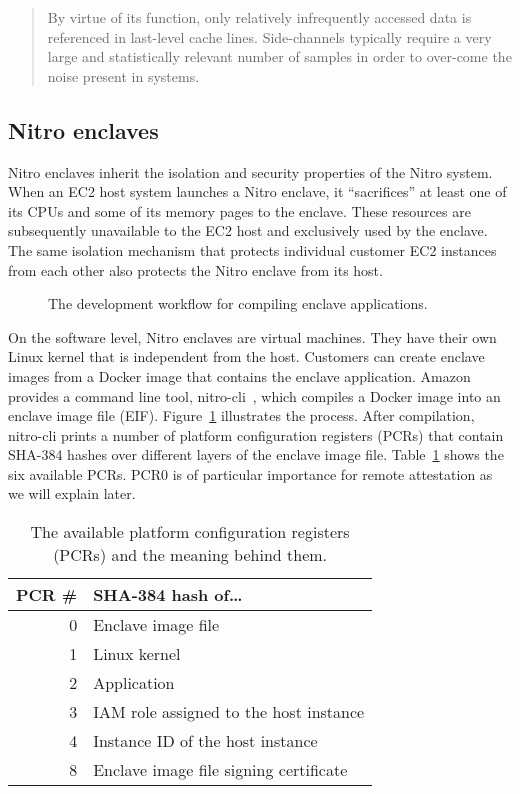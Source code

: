 \begin{quote}
By virtue of its function, only relatively infrequently accessed data is
referenced in last-level cache lines.  Side-channels typically require a very
large and statistically relevant number of samples in order to over-come the
noise present in systems.
\end{quote}

\subsection{Nitro enclaves}%
\label{sec:nitro-enclaves}

Nitro enclaves inherit the isolation and security properties of the Nitro
system.  When an EC2 host system launches a Nitro enclave, it ``sacrifices'' at
least one of its CPUs and some of its memory pages to the enclave.  These
resources are subsequently unavailable to the EC2 host and exclusively used by
the enclave.  The same isolation mechanism that protects individual customer EC2
instances from each other also protects the Nitro enclave from its host.

\begin{figure}[t]
  \centering
  
  \caption{The development workflow for compiling enclave applications.}%
  \label{fig:dev-workflow}
\end{figure}

On the software level, Nitro enclaves are virtual machines.  They have their own
Linux kernel that is independent from the host.  Customers can create enclave
images from a Docker image that contains the enclave application.  Amazon
provides a command line tool, nitro-cli~\cite{nitro-cli}, which compiles a
Docker image into an enclave image file (EIF).  Figure~\ref{fig:dev-workflow}
illustrates the process.  After compilation, nitro-cli prints a number of
platform configuration registers (PCRs) that contain SHA-384 hashes over
different layers of the enclave image file.  Table~\ref{tab:pcr} shows the six
available PCRs.  PCR0 is of particular importance for remote attestation as we
will explain later.

\begin{table}[t]
    \centering
    \begin{tabular}{r l}
    \toprule
      PCR \# & SHA-384 hash of\ldots \\
    \midrule
      0 & Enclave image file \\
      1 & Linux kernel \\
      2 & Application \\
      3 & IAM role assigned to the host instance \\
      4 & Instance ID of the host instance \\
      8 & Enclave image file signing certificate \\
    \bottomrule
    \end{tabular}
    \caption{The available platform configuration registers (PCRs) and the
    meaning behind them.}%
    \label{tab:pcr}
\end{table}

